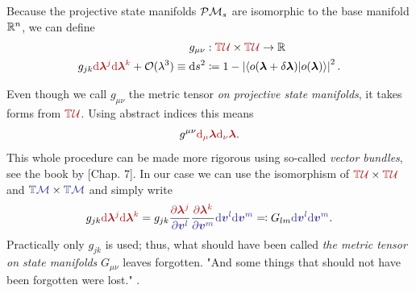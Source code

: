 \begin{definition}
    \label{def:metricTensor}

Because the projective state manifolds $\mathcal{P}\mathcal{M}_s$ are isomorphic to the base manifold $\mathbb{R}^n$, we can define
    \begin{equation}
        \begin{split}
            g_{\mu\nu}&: \redd{\T\mathcal U}\times \redd{\T\mathcal U}\rightarrow \R \\
            g_{jk}\redd{\d \bm \lambda^j \d\bm \lambda^k}+\O(\lambda^3) \equiv \d s^2 &\coloneqq 1-\left|\braket{o(\bm\llambda+\delta\bm\llambda)|o(\bm\llambda)}\right|^2.
            \label{eq:metricTensorDef}
        \end{split}
    \end{equation} 
   
\end{definition}
Even though we call $g_{\mu\nu}$ the metric tensor \emph{on projective state manifolds}, it takes forms from $\redd{\T\mathcal U}$. Using abstract indices this means
\begin{equation}
    g^{\mu\nu}\redd{\d_\mu \llambda \d_\nu \llambda}.
\end{equation}
This whole procedure can be made more rigorous using so-called \emph{vector bundles}, see the book by \citet{lu}[Chap. 7]. In our case we can use the isomorphism of $\redd{\T\mathcal U}\times \redd{\T\mathcal U}$ and $\bluee{\T\M}\times \bluee{\T\M}$ and simply write
\begin{equation}
    g_{jk}\redd{\d\llambda^j \d\llambda^k} = g_{jk}\frac{\redd{\partial\llambda^j}}{\bluee{\partial\bm v^l}}\frac{\redd{\partial\llambda^k}}{\bluee{\partial\bm v^m}} \bluee{\d\bm v^l \d \bm v^m} \eqqcolon G_{lm}\bluee{\d\bm v^l \d \bm v^m}.
\end{equation}
Practically only $g_{jk}$ is used; thus, what should have been called \emph{the metric tensor on state manifolds} $G_{\mu\nu}$ leaves forgotten. "And some things that should not have been forgotten were lost." \citet{lordOfTheRings}.







